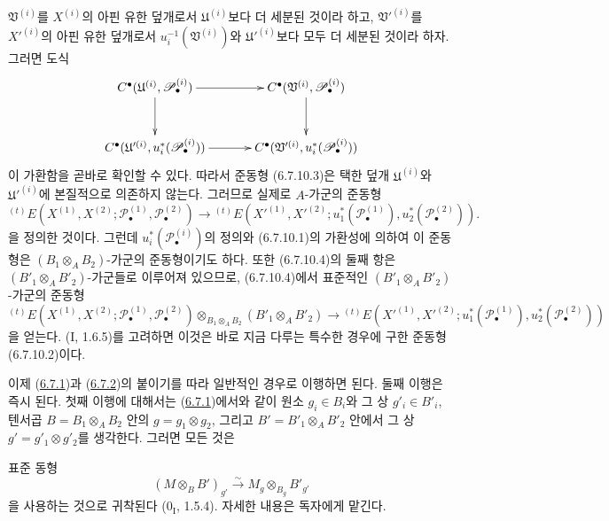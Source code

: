 \begin{env}[6.7.10]
$\mathfrak V^{(i)}$를 $X^{(i)}$의 아핀 유한 덮개로서
$\mathfrak U^{(i)}$보다 더 세분된 것이라 하고,
$\mathfrak V'^{(i)}$를 $X'^{(i)}$의 아핀 유한 덮개로서
$u_i^{-1}(\mathfrak V^{(i)})$와 $\mathfrak U'^{(i)}$보다 모두 더
세분된 것이라 하자. 그러면 도식
\[
\xymatrix@C=34pt@R=30pt{
  C^\bullet(\mathfrak U^{(i)},\mathscr P_\bullet^{(i)})
  \ar[r]\ar[d]
  & C^\bullet(\mathfrak V^{(i)},\mathscr P_\bullet^{(i)})\ar[d]
  \\
  C^\bullet(\mathfrak U'^{(i)},u_i^*(\mathscr P_\bullet^{(i)}))
  \ar[r]
  & C^\bullet(\mathfrak V'^{(i)},u_i^*(\mathscr P_\bullet^{(i)}))
}
\]
이 가환함을 곧바로 확인할 수 있다. 따라서 준동형 (6.7.10.3)은
택한 덮개 $\mathfrak U^{(i)}$와 $\mathfrak U'^{(i)}$에 본질적으로
의존하지 않는다. 그러므로 실제로 $A$-가군의 준동형
\[
  {}^{(t)}E
  (X^{(1)},X^{(2)};\mathscr P_\bullet^{(1)},\mathscr P_\bullet^{(2)})
  \longrightarrow
  {}^{(t)}E
  (X'^{(1)},X'^{(2)};
   u_1^*(\mathscr P_\bullet^{(1)}),u_2^*(\mathscr P_\bullet^{(2)})).
  \tag{6.7.10.4}\label{III.6.7.10.4.fr}
\]
을 정의한 것이다. 그런데 $u_i^*(\mathscr P_\bullet^{(i)})$의 정의와
(6.7.10.1)의 가환성에 의하여 이 준동형은
$(B_1\otimes_A B_2)$-가군의 준동형이기도 하다. 또한 (6.7.10.4)의
둘째 항은 $(B'_1\otimes_A B'_2)$-가군들로 이루어져 있으므로,
(6.7.10.4)에서 표준적인 $(B'_1\otimes_A B'_2)$-가군의 준동형
\[
  {}^{(t)}E
  (X^{(1)},X^{(2)};\mathscr P_\bullet^{(1)},\mathscr P_\bullet^{(2)})
  \otimes_{B_1\otimes_A B_2}(B'_1\otimes_A B'_2)
  \longrightarrow
  {}^{(t)}E
  (X'^{(1)},X'^{(2)};
   u_1^*(\mathscr P_\bullet^{(1)}),u_2^*(\mathscr P_\bullet^{(2)}))
  \tag{6.7.10.5}\label{III.6.7.10.5.fr}
\]
을 얻는다. (I, 1.6.5)를 고려하면 이것은 바로 지금 다루는 특수한
경우에 구한 준동형 (6.7.10.2)이다.

이제 (\hyperref[III.6.7.1-fr]{6.7.1})과
(\hyperref[III.6.7.2-fr]{6.7.2})의 붙이기를 따라 일반적인 경우로
이행하면 된다. 둘째 이행은 즉시 된다. 첫째 이행에 대해서는
(\hyperref[III.6.7.1-fr]{6.7.1})에서와 같이 원소
$g_i\in B_i$와 그 상 $g'_i\in B'_i$, 텐서곱
$B=B_1\otimes_A B_2$ 안의 $g=g_1\otimes g_2$, 그리고
$B'=B'_1\otimes_A B'_2$ 안에서 그 상
$g'=g'_1\otimes g'_2$를 생각한다. 그러면 모든 것은


표준 동형
\[
  (M\otimes_B B')_{g'}
  \xrightarrow{\sim}
  M_g\otimes_{B_g}B'_{g'}
\]
을 사용하는 것으로 귀착된다 ($0_{\mathrm I}$, 1.5.4). 자세한 내용은
독자에게 맡긴다.
\end{env}


